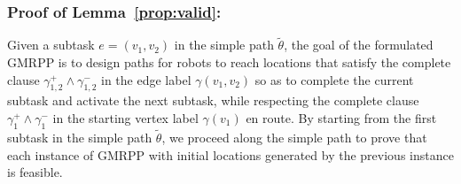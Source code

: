 \documentclass[Afour,sageh,times]{sagej}
\begin{document}
{{%




\subsubsection{Proof of Lemma~\ref{prop:valid}:}\label{app:valid}
Given a subtask $e = (v_1, v_2)$ in the simple path $\tilde{\theta}$, the goal of the formulated  GMRPP is to design paths for robots to reach locations that satisfy the complete clause $\gamma_{1,2}^+ \wedge \gamma_{1,2}^-$ in the edge label $\gamma(v_1, v_2)$ so as to complete the current subtask and activate the next subtask, while respecting the complete clause $\gamma_1^+ \wedge \gamma_1^-$ in the starting vertex label $\gamma(v_1)$ en route. By starting from the first subtask in the simple path $\tilde{\theta}$, we proceed along the simple path to prove that each instance of GMRPP with initial locations generated by the previous instance is feasible.


}}
\end{document}

